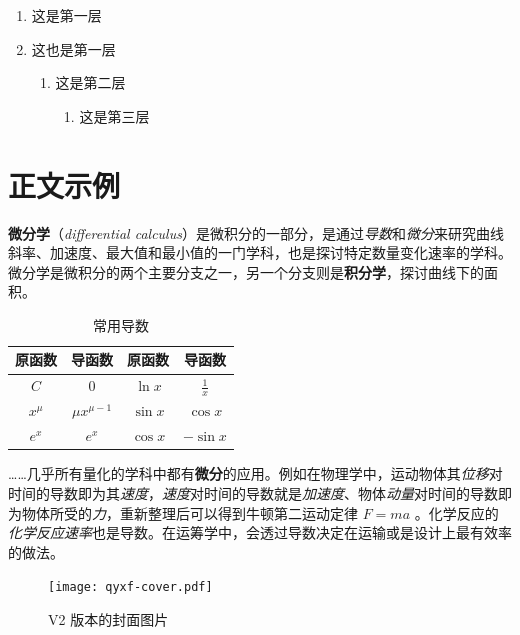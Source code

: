 \documentclass[
  10pt,
  twoside,
  openany,
  b5paper, %
  colorscheme = rbb, %
  xits = false,
]{qyxf-book}
\begin{document}
\begin{enumerate}
  \item 这是第一层
  \item 这也是第一层
  \begin{enumerate}
    \item 这是第二层
    \begin{enumerate}
      \item 这是第三层
    \end{enumerate}
  \end{enumerate}
\end{enumerate}

\section{正文示例}

\textbf{微分学}（\emph{differential calculus}）是微积分的一部分，是通过\emph{导数}和\emph{微分}来研究曲线斜率、加速度、最大值和最小值的一门学科，也是探讨特定数量变化速率的学科。微分学是微积分的两个主要分支之一，另一个分支则是\textbf{积分学}，探讨曲线下的面积。


\begin{table}[htbp]
  \centering
  \caption{常用导数}
  \begin{tabular}{cccc}
    \toprule
    \textbf{原函数} & \textbf{导函数}   & \textbf{原函数} & \textbf{导函数} \\
    \midrule
    $C$             & $0$               & $\ln x$         & $\frac{1}{x}$   \\
    $x^\mu$         & $\mu x^{\mu - 1}$ & $\sin x$        & $\cos x$        \\
    $e^x$           & $e^x$             & $\cos x$        & $-\sin x$       \\
    \bottomrule
  \end{tabular}
\end{table}

……几乎所有量化的学科中都有\textbf{微分}的应用。例如在物理学中，运动物体其\emph{位移}对时间的导数即为其\emph{速度}，\emph{速度}对时间的导数就是\emph{加速度}、物体\emph{动量}对时间的导数即为物体所受的\emph{力}，重新整理后可以得到牛顿第二运动定律 $F=ma$ 。化学反应的\emph{化学反应速率}也是导数。在运筹学中，会透过导数决定在运输或是设计上最有效率的做法。

\begin{figure}[htbp]
  \centering
  \texttt{[image: qyxf-cover.pdf]}
  \caption{V2 版本的封面图片}
  \label{fig:qyxf-logo}
\end{figure}
\end{document}
